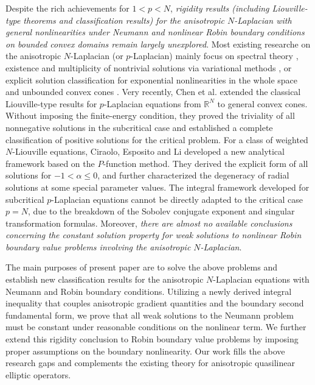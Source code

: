 \documentclass[10pt,a4paper]{amsart}
\numberwithin{equation}{section}
\begin{document}
Despite the rich achievements for $1<p<N$, \textit{rigidity results (including Liouville-type theorems and classification results)  for the anisotropic $N$-Laplacian with general nonlinearities under Neumann and nonlinear Robin boundary conditions on bounded convex domains remain largely unexplored}. Most existing researche on the anisotropic $N$-Laplacian (or $p$-Laplacian) mainly focus on spectral theory \cite{PPS}, existence and multiplicity of nontrivial solutions via variational methods  \cite{FH, GL2005}, or explicit solution classification for exponential nonlinearities in the whole space \cite{CL2024} and unbounded convex cones \cite{DGL}. Very recently, Chen et al. \cite{CDGL2026} extended the classical Liouville-type results for $p$-Laplacian equations from $\mathbb{R}^N$ to general convex cones. Without imposing the finite-energy condition, they proved the triviality of all nonnegative solutions in the subcritical case and established a complete classification of positive solutions for the critical problem. For a class of weighted $N$-Liouville equations, Ciraolo, Esposito and Li \cite{CEL} developed a new analytical framework based on the $P$-function method. They derived the explicit form of all solutions for $-1<\alpha\leq 0$, and further characterized the degeneracy of radial solutions at some special parameter values.
The integral framework developed for subcritical $p$-Laplacian equations cannot be directly adapted to the critical case $p=N$, due to the breakdown of the Sobolev conjugate exponent and singular transformation formulas. Moreover, \textit{there are almost no available conclusions concerning the constant solution property for weak solutions to nonlinear Robin boundary value problems involving the anisotropic $N$-Laplacian}.

 The main purposes of present paper are to solve the above problems and establish new classification results for the anisotropic $N$-Laplacian equations with Neumann and Robin boundary conditions. Utilizing a newly derived integral inequality that couples anisotropic gradient quantities and the boundary second fundamental form, we prove that all weak solutions to the Neumann problem must be constant under reasonable conditions on the nonlinear term. We further extend this rigidity conclusion to Robin boundary value problems by imposing proper assumptions on the boundary nonlinearity. Our work fills the above research gaps and complements the existing theory for anisotropic quasilinear elliptic operators.
\end{document}
